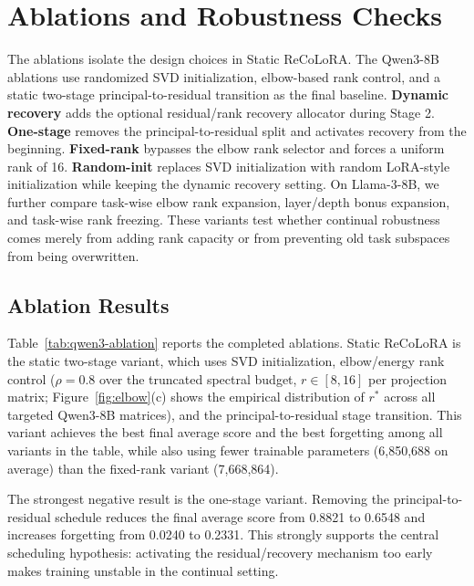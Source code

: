 \documentclass[11pt]{article}
\begin{document}
\section{Ablations and Robustness Checks}\label{app:ablations}
The ablations isolate the design choices in Static ReCoLoRA. The Qwen3-8B ablations use randomized SVD initialization, elbow-based rank control, and a static two-stage principal-to-residual transition as the final baseline. \textbf{Dynamic recovery} adds the optional residual/rank recovery allocator during Stage 2. \textbf{One-stage} removes the principal-to-residual split and activates recovery from the beginning. \textbf{Fixed-rank} bypasses the elbow rank selector and forces a uniform rank of 16. \textbf{Random-init} replaces SVD initialization with random LoRA-style initialization while keeping the dynamic recovery setting. On Llama-3-8B, we further compare task-wise elbow rank expansion, layer/depth bonus expansion, and task-wise rank freezing. These variants test whether continual robustness comes merely from adding rank capacity or from preventing old task subspaces from being overwritten.
\subsection{Ablation Results}
Table~\ref{tab:qwen3-ablation} reports the completed ablations. Static ReCoLoRA is the static two-stage variant, which uses SVD initialization, elbow/energy rank control ($\rho=0.8$ over the truncated spectral budget, $r\in[8,16]$ per projection matrix; Figure~\ref{fig:elbow}(c) shows the empirical distribution of $r^*$ across all targeted Qwen3-8B matrices), and the principal-to-residual stage transition. This variant achieves the best final average score and the best forgetting among all variants in the table, while also using fewer trainable parameters (6,850,688 on average) than the fixed-rank variant (7,668,864).

The strongest negative result is the one-stage variant. Removing the principal-to-residual schedule reduces the final average score from 0.8821 to 0.6548 and increases forgetting from 0.0240 to 0.2331. This strongly supports the central scheduling hypothesis: activating the residual/recovery mechanism too early makes training unstable in the continual setting.
\end{document}
